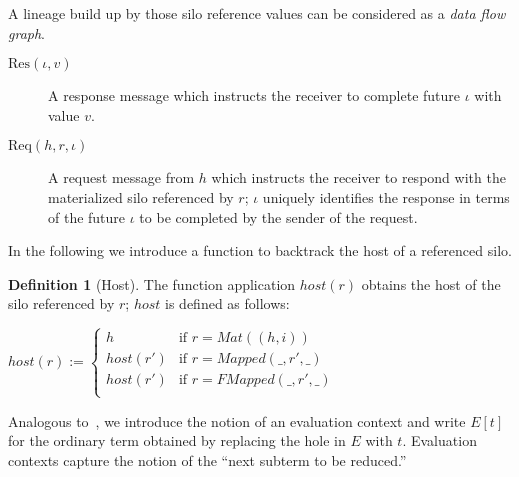 \documentclass{article}
\theoremstyle{definition}
\newtheorem{defn}{Definition}[section]
\newcommand{\Req}[3]{\text{Req}(#1, #2, #3)}
\newcommand{\Res}[2]{\text{Res}(#1, #2)}
\begin{document}
A lineage build up by those silo reference values can be considered as a {\emph{data flow graph}}\cite{???}. %

\begin{description}
\item[${\Res \iota v}$] A response message which instructs the receiver to complete future $\iota$ with value $v$. %

\item[${\Req h r \iota}$] A request message from $h$ which instructs the receiver to respond with the materialized silo referenced by $r$; $\iota$ uniquely identifies the response in terms of the future $\iota$ to be completed by the sender of the request.

\end{description}

In the following we introduce a function to backtrack the host of a referenced silo.

\begin{defn}[Host]
  The function application $host(r)$ obtains the host of the silo referenced by $r$; $host$ is defined as follows:
  
  $host(r) := \begin{cases}
    h        & \text{if } r = Mat((h, i)) \\
    host(r') & \text{if } r = Mapped(\_, r', \_) \\
    host(r') & \text{if } r = FMapped(\_, r', \_) \\
    \end{cases}$
\end{defn}

Analogous to~\cite{TAPL}, we introduce the notion of an evaluation context and write $E[t]$ for the ordinary term obtained by replacing the hole in $E$ with $t$. Evaluation contexts capture the notion of the ``next subterm to be reduced.''
\end{document}
